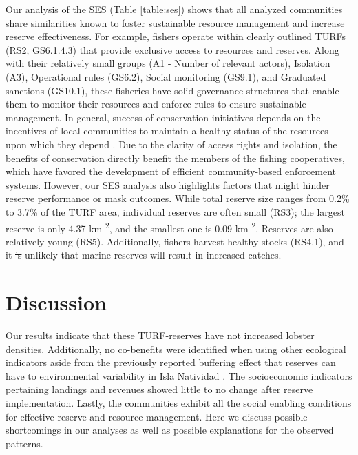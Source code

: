 \documentclass{frontiersSCNS}
\providecommand{\DIFaddtex}[1]{{\protect\color{blue}\uwave{#1}}} %
\providecommand{\DIFdeltex}[1]{{\protect\color{red}\sout{#1}}}                      %
\providecommand{\DIFaddbegin}{} %
\providecommand{\DIFaddend}{} %
\providecommand{\DIFdelbegin}{} %
\providecommand{\DIFdelend}{} %
\providecommand{\DIFadd}[1]{\texorpdfstring{\DIFaddtex{#1}}{#1}} %
\providecommand{\DIFdel}[1]{\texorpdfstring{\DIFdeltex{#1}}{}} %
\begin{document}
Our analysis of the SES (Table \ref{table:ses}) shows that all analyzed
communities share similarities known to foster sustainable resource
management and increase reserve effectiveness. For example, fishers
operate within clearly outlined TURFs (RS2, GS6.1.4.3) that provide
exclusive access to resources and reserves. Along with their relatively
small groups (A1 - Number of relevant actors), Isolation (A3),
Operational rules (GS6.2), Social monitoring (GS9.1), and Graduated
sanctions (GS10.1), these fisheries have solid governance structures
that enable them to monitor their resources and enforce rules to ensure
sustainable management. In general, success of conservation initiatives
depends on the incentives of local communities to maintain a healthy
status of the resources upon which they depend \citep{jupiter_2017}. Due
to the clarity of access rights and isolation, the benefits of
conservation directly benefit the members of the fishing cooperatives,
which have favored the development of efficient community-based
enforcement systems. However, our SES analysis also highlights factors
that might hinder reserve performance or mask outcomes. While total
reserve size ranges from 0.2\% to 3.7\% of the TURF area, individual
reserves are often small (RS3); the largest reserve is only 4.37 km
\textsuperscript{2}, and the smallest one is 0.09 km
\textsuperscript{2}. Reserves are also relatively young (RS5).
Additionally, fishers harvest healthy stocks (RS4.1), and it \DIFdelbegin \DIFdel{'s }\DIFdelend \DIFaddbegin \DIFadd{is }\DIFaddend unlikely
that marine reserves will result in increased catches.

\hypertarget{discussion}{%
\section{Discussion}\label{discussion}}

Our results indicate that these TURF-reserves have not increased lobster
densities. Additionally, no co-benefits were identified when using other
ecological indicators aside from the previously reported buffering
effect that reserves can have to environmental variability in Isla
Natividad \citep{micheli_2012-EU}. The socioeconomic indicators
pertaining landings and revenues showed little to no change after
reserve implementation. Lastly, the communities exhibit all the social
enabling conditions for effective reserve and resource management. Here
we discuss possible shortcomings in our analyses as well as possible
explanations for the observed patterns.
\end{document}

